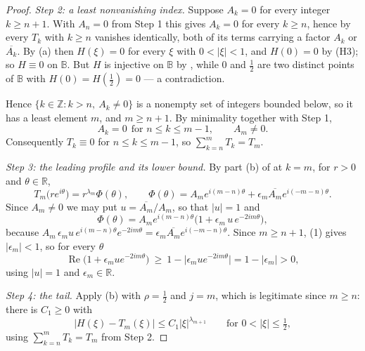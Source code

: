 \begin{proof}
\emph{Step 2: a least nonvanishing index.}  Suppose $A_k=0$ for every integer
$k\ge n+1$.  With $A_n=0$ from Step 1 this gives $A_k=0$ for every $k\ge n$,
hence by  every $T_k$ with $k\ge n$ vanishes identically,
both of its terms carrying a factor $A_k$ or $\overline{A_k}$.  By (a) then
$H(\xi)=0$ for every $\xi$ with $0<|\xi|<1$, and $H(0)=0$ by (H3); so
$H\equiv0$ on $\mathbb{B}$.  But $H$ is injective on $\mathbb{B}$ by
, while $0$ and $\tfrac12$ are two distinct points of
$\mathbb{B}$ with $H(0)=H(\tfrac12)=0$ --- a contradiction.

Hence $\{k\in\mathbb{Z}:k>n,\ A_k\neq0\}$ is a nonempty set of integers bounded
below, so it has a least element $m$, and $m\ge n+1$.  By minimality together
with Step 1,
\begin{equation}\tag{3}
  A_k=0\ \ \text{for } n\le k\le m-1,\qquad A_m\neq0 .
\end{equation}
Consequently $T_k\equiv0$ for $n\le k\le m-1$, so
$\sum_{k=n}^{m}T_k=T_m$.

\emph{Step 3: the leading profile and its lower bound.}  By part (b) of
 at $k=m$, for $r>0$ and $\theta\in\mathbb{R}$,
\begin{equation}\tag{4}
  T_m\bigl(re^{i\theta}\bigr)=r^{\lambda_m}\Phi(\theta),\qquad
  \Phi(\theta)=A_me^{i(m-n)\theta}+\epsilon_m\overline{A_m}e^{i(-m-n)\theta}.
\end{equation}
Since $A_m\neq0$ we may put $u=\overline{A_m}/A_m$, so that $|u|=1$ and
\begin{equation}\tag{5}
  \Phi(\theta)=A_me^{i(m-n)\theta}\bigl(1+\epsilon_m\,u\,e^{-2im\theta}\bigr),
\end{equation}
because $A_m\,\epsilon_m u\,e^{i(m-n)\theta}e^{-2im\theta}
=\epsilon_m\overline{A_m}e^{i(-m-n)\theta}$.  Since $m\ge n+1$, (1) gives
$|\epsilon_m|<1$, so for every $\theta$
\begin{equation}\tag{6}
  \operatorname{Re}\bigl(1+\epsilon_m u e^{-2im\theta}\bigr)
  \ \ge\ 1-\bigl|\epsilon_m u e^{-2im\theta}\bigr|=1-|\epsilon_m|>0 ,
\end{equation}
using $|u|=1$ and $\epsilon_m\in\mathbb{R}$.

\emph{Step 4: the tail.}  Apply (b) with $\rho=\tfrac12$ and $j=m$, which is
legitimate since $m\ge n$: there is $C_1\ge0$ with
\begin{equation}\tag{7}
  \bigl|H(\xi)-T_m(\xi)\bigr|\le C_1|\xi|^{\lambda_{m+1}}
  \qquad\text{for }0<|\xi|\le\tfrac12 ,
\end{equation}
using $\sum_{k=n}^{m}T_k=T_m$ from Step 2.


\end{proof}
